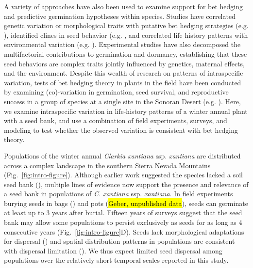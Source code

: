 \documentclass[12pt, oneside, titlepage]{article}   	%
\begin{document}
A variety of approaches have also been used to examine support for bet hedging and predictive germination hypotheses within species. Studies have correlated genetic variation or morphological traits with putative bet hedging strategies (e.g. \cite{hacker1984,hacker1989,philippi1993a,clauss2000}), identified clines in seed behavior (e.g. \cite{fernandez-pascual2013,gremer2020}, and correlated life history patterns with environmental variation (e.g. \cite{philippi1993}). Experimental studies have also decomposed the multifactorial contributions to germination and dormancy, establishing that these seed behaviors are complex traits jointly influenced by genetics, maternal effects, and the environment. Despite this wealth of research on patterns of intraspecific variation, tests of bet hedging theory in plants in the field have been conducted by examining (co)-variation in germination, seed survival, and reproductive success in a group of species at a single site in the Sonoran Desert (e.g. \cite{venable2007,gremer2014,gremer2016}). Here, we examine intraspecific variation in life-history patterns of a winter annual plant with a seed bank, and use a combination of field experiments, surveys, and modeling to test whether the observed variation is consistent with bet hedging theory. 

Populations of the winter annual \textit{Clarkia xantiana} ssp. \textit{xantiana} are distributed across a complex landscape in the southern Sierra Nevada Mountains (Fig.~\ref{fig:intro-figure}). Although earlier work suggested the species lacked a soil seed bank (\cite{lewis1962}), multiple lines of evidence now support the presence and relevance of a seed bank in populations of \textit{C. xantiana} ssp. \textit{xantiana}. In field experiments burying seeds in bags (\cite{eckhart2011}) and pots (\hl{Geber, unpublished data}), seeds can germinate at least up to 3 years after burial. Fifteen years of surveys suggest that the seed bank may allow some populations to persist exclusively as seeds for as long as 4 consecutive years (Fig.~\ref{fig:intro-figure}D). Seeds lack morphological adaptations for dispersal (\cite{knies2004}) and spatial distribution patterns in populations are consistent with dispersal limitation (\cite{kramer2011}). We thus expect limited seed dispersal among populations over the relatively short temporal scales reported in this study.
\end{document}
